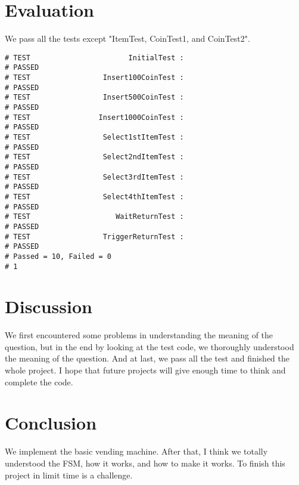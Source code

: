 \documentclass[12pt,a4paper]{article}
\begin{document}
\newpage

\section{Evaluation}

We pass all the tests except "ItemTest, CoinTest1, and CoinTest2".

\lstset{language=Verilog}
\begin{lstlisting}
# TEST                       InitialTest :
# PASSED
# TEST                 Insert100CoinTest :
# PASSED
# TEST                 Insert500CoinTest :
# PASSED
# TEST                Insert1000CoinTest :
# PASSED
# TEST                 Select1stItemTest :
# PASSED
# TEST                 Select2ndItemTest :
# PASSED
# TEST                 Select3rdItemTest :
# PASSED
# TEST                 Select4thItemTest :
# PASSED
# TEST                    WaitReturnTest :
# PASSED
# TEST                 TriggerReturnTest :
# PASSED
# Passed = 10, Failed = 0
# 1
\end{lstlisting}

\newpage
\section{Discussion}

We first encountered some problems in understanding the meaning of the question, 
but in the end by looking at the test code, 
we thoroughly understood the meaning of the question.
And at last, we pass all the test and finished the whole project.
I hope that future projects will give enough time to think and complete the code.

\section{Conclusion}

We implement the basic vending machine.
After that, I think we totally understood the FSM, how it works, and how to make it works.
To finish this project in limit time is a challenge.
\end{document}

